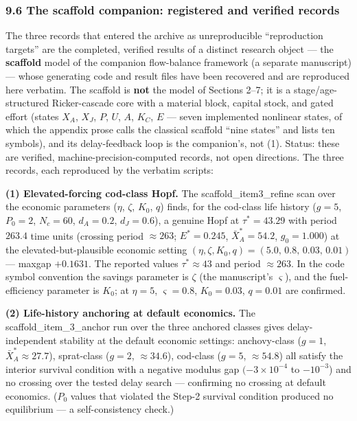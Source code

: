 \documentclass[11pt]{article}
\begin{document}
\subsubsection{9.6 The scaffold companion: registered and verified
records}\label{the-scaffold-companion-registered-and-verified-records}

The three records that entered the archive as unreproducible
``reproduction targets'' are the completed, verified results of a
distinct research object --- the \textbf{scaffold} model of the
companion flow-balance framework (a separate manuscript) --- whose
generating code and result files have been recovered and are reproduced
here verbatim. The scaffold is \textbf{not} the model of Sections 2--7;
it is a stage/age-structured Ricker-cascade core with a material block,
capital stock, and gated effort (states \(X_A\), \(X_J\), \(P\), \(U\),
\(A\), \(K_C\), \(E\) --- seven implemented nonlinear states, of which
the appendix prose calls the classical scaffold ``nine states'' and
lists ten symbols), and its delay-feedback loop is the companion's, not
(1). Status: these are verified, machine-precision-computed records, not
open directions. The three records, each reproduced by the verbatim
scripts:

\textbf{(1) Elevated-forcing cod-class Hopf.} The
scaffold\_item3\_refine scan over the economic parameters (\(\eta\),
\(\zeta\), \(K_0\), \(q\)) finds, for the cod-class life history
(\(g = 5\), \(P_0 = 2\), \(N_c = 60\), \(d_A = 0.2\), \(d_J = 0.6\)), a
genuine Hopf at \(\tau^* = 43.29\) with period \(263.4\) time units
(crossing period \(\approx 263\); \(E^* = 0.245\),
\(\bar X_A^* = 54.2\), \(g_0 = 1.000\)) at the elevated-but-plausible
economic setting
\((\eta, \zeta, K_0, q) = (5.0,\, 0.8,\, 0.03,\, 0.01)\) --- maxgap
\(+0.1631\). The reported values \(\tau^* \approx 43\) and period
\(\approx 263\). In the code symbol convention the savings parameter is
\(\zeta\) (the manuscript's \(\varsigma\)), and the fuel-efficiency
parameter is \(K_0\); at \(\eta = 5\), \(\varsigma = 0.8\),
\(K_0 = 0.03\), \(q = 0.01\) are confirmed.

\textbf{(2) Life-history anchoring at default economics.} The
scaffold\_item\_3\_anchor run over the three anchored classes gives
delay-independent stability at the default economic settings:
anchovy-class (\(g = 1\), \(\bar X_A^* \approx 27.7\)), sprat-class
(\(g = 2\), \(\approx 34.6\)), cod-class (\(g = 5\), \(\approx 54.8\))
all satisfy the interior survival condition with a negative modulus gap
\((-3\times10^{-4}\) to \(-10^{-3}\)) and no crossing over the tested
delay search --- confirming no crossing at default economics. (\(P_0\)
values that violated the Step-2 survival condition produced no
equilibrium --- a self-consistency check.)
\end{document}
